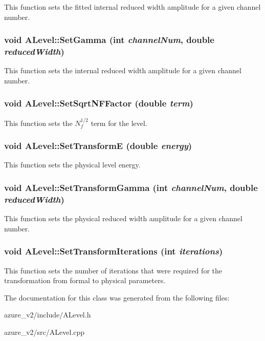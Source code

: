 This function sets the fitted internal reduced width amplitude for a given channel number. 
\subsubsection{\setlength{\rightskip}{0pt plus 5cm}void ALevel::Set\-Gamma (int {\em channel\-Num}, double {\em reduced\-Width})}\label{classALevel_81e74a679c89b2ace84390657f472ed9}


This function sets the internal reduced width amplitude for a given channel number. 
\subsubsection{\setlength{\rightskip}{0pt plus 5cm}void ALevel::Set\-Sqrt\-NFFactor (double {\em term})}\label{classALevel_c77b8a557bf77997c5dcc0c4c860a800}


This function sets the $N_f^{1/2}$ term for the level. 
\subsubsection{\setlength{\rightskip}{0pt plus 5cm}void ALevel::Set\-Transform\-E (double {\em energy})}\label{classALevel_abcc4bc03020020ea8873cb5ffeb1f36}


This function sets the physical level energy. 
\subsubsection{\setlength{\rightskip}{0pt plus 5cm}void ALevel::Set\-Transform\-Gamma (int {\em channel\-Num}, double {\em reduced\-Width})}\label{classALevel_e167fd806cf1a1a25bec6966d6428beb}


This function sets the physical reduced width amplitude for a given channel number. 
\subsubsection{\setlength{\rightskip}{0pt plus 5cm}void ALevel::Set\-Transform\-Iterations (int {\em iterations})}\label{classALevel_2f14b9242293227ffad8eeb4024bb6d7}


This function sets the number of iterations that were required for the transformation from formal to physical parameters. 

The documentation for this class was generated from the following files:\begin{CompactItemize}
\item 
azure\_\-v2/include/ALevel.h\item 
azure\_\-v2/src/ALevel.cpp\end{CompactItemize}
